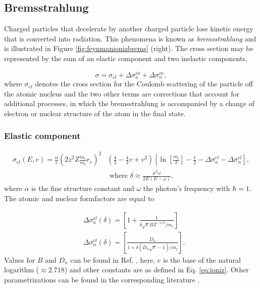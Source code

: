 \subsection{Bremsstrahlung}
Charged particles that decelerate by another charged particle lose kinetic energy that is converted into radiation. This phenomena is known as \textit{bremsstrahlung} and is illustrated in Figure \ref{fig:feynmanionizbrems} (right). The cross section may be represented by the sum of an elastic component and two inelastic components,

\begin{equation}
\sigma = \sigma_{el} + \Delta \sigma^{in}_a + \Delta \sigma^{in}_n,
\end{equation}
where $\sigma_{el}$ denotes the cross section for the Coulomb scattering of the particle off the atomic nucleus and the two other terms are corrections that account for additional processes, in which the bremsstrahlung is accompanied by a change of electron or nuclear structure of the atom in the final state.

\subsubsection{Elastic component}
\begin{equation}
\begin{split}
\sigma_{el} (E,v) = \frac{ \alpha}{v} \left(2 z^2 Z \frac{m_e}{m_t} r_e\right)^2
 &\left(\frac{4}{3} - \frac{4}{3}v +v^2 \right) \left[\ln \left[\frac{m_t}{\delta}\right] - \frac{1}{2} - \Delta \sigma^{el}_a -\Delta \sigma^{el}_ n \right],\\
& \textrm{ \ \ where \ \ } \delta \approx \frac{\mu^2 \omega}{2E(E-\omega)},
\end{split}
\end{equation}
where $\alpha$ is the fine structure constant and $\omega$ the photon's frequency with $\hbar = 1$. The atomic and nuclear formfactors are equal to

\begin{equation}
\label{eq:formfactors}
\begin{split}
&\Delta \sigma^{el}_a(\delta) = \left[ 1+ \frac{1}{\delta \sqrt{e} BZ^{-1/3}/m_e}\right] \\
&\Delta \sigma^{el}_n(\delta) = \left[\frac{D_n}{1+\delta (D_n \sqrt{e} -1)/m_t}\right].
\end{split}
\end{equation}
Values for $B$ and $D_n$ can be found in Ref. \cite{Kelner:1995hu}, here, $e$ is the base of the natural logarithm ($\approx 2.718$) and other constants are as defined in Eq. \ref{eq:ioniz}. Other parametrizations can be found in the corresponding literature \cite{Chirkin:2004hz}. 

